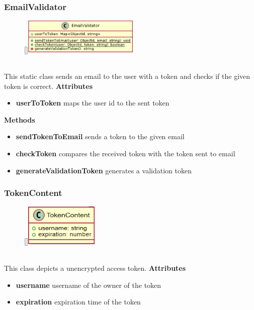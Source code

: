 \subsubsection{EmailValidator}
\label{EmailValidator}
\begin{figure}
    \raisebox{0pt}[\dimexpr{}\baselineskip\relax]{\includegraphics[width=5.5cm]{classes/auth/3.png}}
\end{figure} 
~\\
This static class sends an email to the user with a token and checks if the given token is correct.
\newline
\newline
\textbf{Attributes}
\begin{itemize}
    \item \textbf{userToToken} maps the user id to the sent token
\end{itemize}
\textbf{Methods}
\begin{itemize}
    \item \textbf{sendTokenToEmail} sends a token to the given email 
    \item \textbf{checkToken} compares the received token with the token sent to email
    \item \textbf{generateValidationToken} generates a validation token
\end{itemize}

\subsubsection{TokenContent}
\label{TokenContent}
\begin{figure}
    \raisebox{0pt}[\dimexpr{}\baselineskip\relax]{\includegraphics[width=3.5cm]{classes/auth/4.png}}
\end{figure} 
~\\
This class depicts a unencrypted access token.
\newline
\newline
\newline
\newline
\newline
\textbf{Attributes}
\begin{itemize}
    \item \textbf{username} username of the owner of the token
    \item \textbf{expiration} expiration time of the token
\end{itemize}

